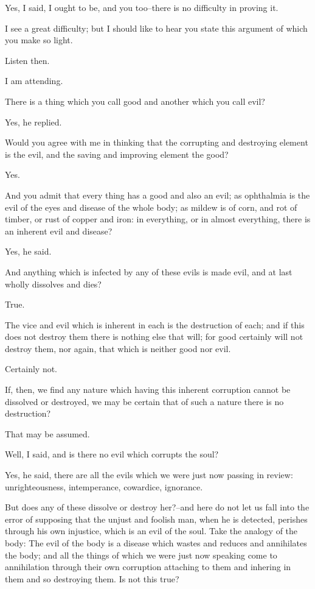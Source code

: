 Yes, I said, I ought to be, and you too--there is no difficulty in
proving it.

I see a great difficulty; but I should like to hear you state this
argument of which you make so light.

Listen then.

I am attending.

There is a thing which you call good and another which you call evil?

Yes, he replied.

Would you agree with me in thinking that the corrupting and destroying
element is the evil, and the saving and improving element the good?

Yes.

And you admit that every thing has a good and also an evil; as
ophthalmia is the evil of the eyes and disease of the whole body; as
mildew is of corn, and rot of timber, or rust of copper and iron: in
everything, or in almost everything, there is an inherent evil and
disease?

Yes, he said.

And anything which is infected by any of these evils is made evil, and
at last wholly dissolves and dies?

True.

The vice and evil which is inherent in each is the destruction of each;
and if this does not destroy them there is nothing else that will; for
good certainly will not destroy them, nor again, that which is neither
good nor evil.

Certainly not.

If, then, we find any nature which having this inherent corruption
cannot be dissolved or destroyed, we may be certain that of such a
nature there is no destruction?

That may be assumed.

Well, I said, and is there no evil which corrupts the soul?

Yes, he said, there are all the evils which we were just now passing in
review: unrighteousness, intemperance, cowardice, ignorance.

But does any of these dissolve or destroy her?--and here do not let us
fall into the error of supposing that the unjust and foolish man, when
he is detected, perishes through his own injustice, which is an evil
of the soul. Take the analogy of the body: The evil of the body is a
disease which wastes and reduces and annihilates the body; and all the
things of which we were just now speaking come to annihilation through
their own corruption attaching to them and inhering in them and so
destroying them. Is not this true?


